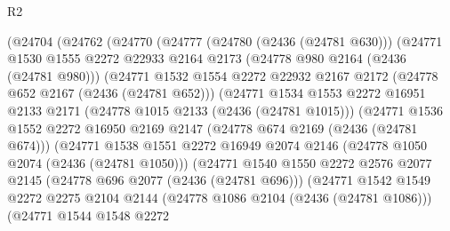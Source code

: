 \begin{lexlean}{R2}
\begin{coremodule}
              (@24704
                (@24762
                  (@24770
                    (@24777
                      (@24780 (@2436 (@24781 @630)))
                      (@24771
                        @1530
                        @1555
                        @2272
                        @22933
                        @2164
                        @2173
                        (@24778 @980 @2164 (@2436 (@24781 @980)))
                        (@24771
                          @1532
                          @1554
                          @2272
                          @22932
                          @2167
                          @2172
                          (@24778 @652 @2167 (@2436 (@24781 @652)))
                          (@24771
                            @1534
                            @1553
                            @2272
                            @16951
                            @2133
                            @2171
                            (@24778 @1015 @2133 (@2436 (@24781 @1015)))
                            (@24771
                              @1536
                              @1552
                              @2272
                              @16950
                              @2169
                              @2147
                              (@24778 @674 @2169 (@2436 (@24781 @674)))
                              (@24771
                                @1538
                                @1551
                                @2272
                                @16949
                                @2074
                                @2146
                                (@24778 @1050 @2074 (@2436 (@24781 @1050)))
                                (@24771
                                  @1540
                                  @1550
                                  @2272
                                  @2576
                                  @2077
                                  @2145
                                  (@24778 @696 @2077 (@2436 (@24781 @696)))
                                  (@24771
                                    @1542
                                    @1549
                                    @2272
                                    @2275
                                    @2104
                                    @2144
                                    (@24778 @1086 @2104 (@2436 (@24781 @1086)))
                                    (@24771
                                      @1544
                                      @1548
                                      @2272

\end{coremodule}
\end{lexlean}
